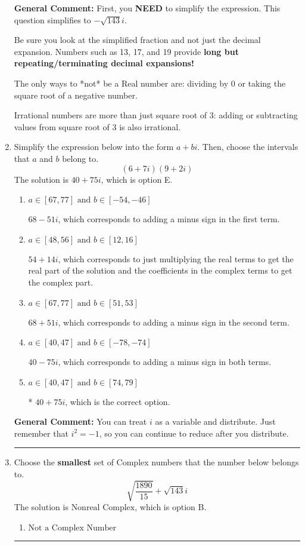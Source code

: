 \documentclass{extbook}[14pt]
\newcommand{\litem}[1]{\item #1

\rule{\textwidth}{0.4pt}}
\begin{document}
\begin{enumerate}
{\textbf{General Comment:} First, you \textbf{NEED} to simplify the expression. This question simplifies to $-\sqrt{143} i$. 
 
 Be sure you look at the simplified fraction and not just the decimal expansion. Numbers such as 13, 17, and 19 provide \textbf{long but repeating/terminating decimal expansions!} 
 
 The only ways to *not* be a Real number are: dividing by 0 or taking the square root of a negative number. 
 
 Irrational numbers are more than just square root of 3: adding or subtracting values from square root of 3 is also irrational.
}
\litem{
Simplify the expression below into the form $a+bi$. Then, choose the intervals that $a$ and $b$ belong to.
\[ (6 + 7 i)(9 + 2 i) \]
The solution is \( 40 + 75 i \), which is option E.\begin{enumerate}[label=\Alph*.]
\item \( a \in [67, 77] \text{ and } b \in [-54, -46] \)

 $68 - 51 i$, which corresponds to adding a minus sign in the first term.
\item \( a \in [48, 56] \text{ and } b \in [12, 16] \)

 $54 + 14 i$, which corresponds to just multiplying the real terms to get the real part of the solution and the coefficients in the complex terms to get the complex part.
\item \( a \in [67, 77] \text{ and } b \in [51, 53] \)

 $68 + 51 i$, which corresponds to adding a minus sign in the second term.
\item \( a \in [40, 47] \text{ and } b \in [-78, -74] \)

 $40 - 75 i$, which corresponds to adding a minus sign in both terms.
\item \( a \in [40, 47] \text{ and } b \in [74, 79] \)

* $40 + 75 i$, which is the correct option.
\end{enumerate}

\textbf{General Comment:} You can treat $i$ as a variable and distribute. Just remember that $i^2=-1$, so you can continue to reduce after you distribute.
}
\litem{
Choose the \textbf{smallest} set of Complex numbers that the number below belongs to.
\[ \sqrt{\frac{1890}{15}}+\sqrt{143} i \]
The solution is \( \text{Nonreal Complex} \), which is option B.\begin{enumerate}[label=\Alph*.]
\item \( \text{Not a Complex Number} \)


\end{enumerate}}
\end{enumerate}
\end{document}
